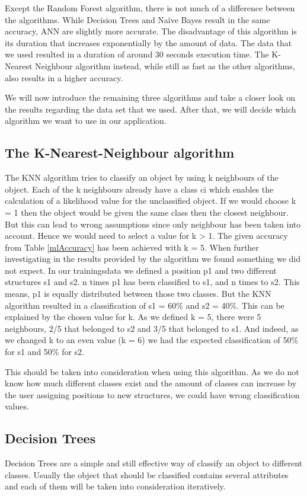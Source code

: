 Except the Random Forest algorithm, there is not much of a difference between the algorithms. While Decision Trees and Na{\"i}ve Bayes result in the same accuracy, ANN are slightly more accurate. The disadvantage of this algorithm is its duration that increases exponentially by the amount of data. The data that we used resulted in a duration of around 30 seconds execution time. The K-Nearest Neighbour algorithm instead, while still as fast as the other algorithms, also results in a higher accuracy.

We will now introduce the remaining three algorithms and take a closer look on the results regarding the data set that we used. After that, we will decide which algorithm we want to use in our application.

\subsection{The K-Nearest-Neighbour algorithm}
\label{sec4.2.1}
The KNN algorithm tries to classify an object by using k neighbours of the object. Each of the k neighbours already have a class ci which enables the calculation of a likelihood value for the unclassified object.
If we would choose k = 1 then the object would be given the same class then the closest neighbour. But this can lead to wrong assumptions since only neighbour has been taken into account. Hence we would need to select a value for k > 1. The given accuracy from Table \ref{mlAccuracy} has been achieved with k = 5.
When further investigating in the results provided by the algorithm we found something we did not expect. In our trainingsdata we defined a position p1 and two different structures s1 and s2. n times p1 has been classified to s1, and n times to s2. This means, p1 is equally distributed between those two classes. But the KNN algorithm resulted in a classification of s1 = 60\% and s2 = 40\%. This can be explained by the chosen value for k. As we defined k = 5, there were 5 neighbours, 2/5 that belonged to s2 and 3/5 that belonged to s1. And indeed, as we changed k to an even value (k = 6) we had the expected classification of 50\% for s1 and 50\% for s2.

This should be taken into consideration when using this algorithm. As we do not know how much different classes exist and the amount of classes can increase by the user assigning positions to new structures, we could have wrong classification values.

\subsection{Decision Trees}
\label{sec4.2.2}
Decision Trees are a simple and still effective way of classify an object to different classes. Usually the object that should be classified contains several attributes and each of them will be taken into consideration iteratively.

